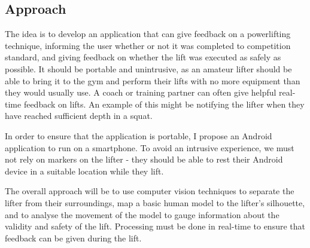 \subsection{Approach}

The idea is to develop an application that can give feedback on a powerlifting technique, informing the user whether or not it was completed to competition standard, and giving feedback on whether the lift was executed as safely as possible. It should be portable and unintrusive, as an amateur lifter should be able to bring it to the gym and perform their lifts with no more equipment than they would usually use. A coach or training partner can often give helpful real-time feedback on lifts. An example of this might be notifying the lifter when they have reached sufficient depth in a squat.

In order to ensure that the application is portable, I propose an Android application to run on a smartphone. To avoid an intrusive experience, we must not rely on markers on the lifter - they should be able to rest their Android device in a suitable location while they lift.

The overall approach will be to use computer vision techniques to separate the lifter from their surroundings, map a basic human model to the lifter's silhouette, and to analyse the movement of the model to gauge information about the validity and safety of the lift. Processing must be done in real-time to ensure that feedback can be given during the lift.
